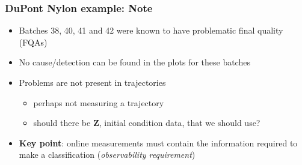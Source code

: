 \begin{frame}\frametitle{DuPont Nylon example: Note}

	\begin{itemize}
		\item	Batches 38, 40, 41 and 42 were known to have problematic final quality (FQAs)
		
		\item	No cause/detection can be found in the plots for these batches
		
		\item	Problems are not present in trajectories
				
				\begin{itemize}
					\item	perhaps not measuring a trajectory
					
					\item	should there be \( \mathbf{Z} \), initial condition data, that we should use?
				\end{itemize}
		
		\item	\textbf{Key point}: online measurements must contain the information required to make a classification (\emph{observability requirement})			
		
	\end{itemize}
	
	
\end{frame}

